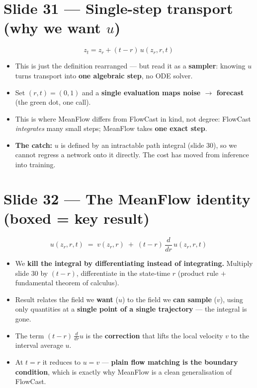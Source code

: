 \documentclass[11pt]{article}
\begin{document}
\section*{Slide 31 --- Single-step transport (why we want $u$)}
\begin{equation*}
  z_t = z_r + (t - r)\, u(z_r, r, t)
\end{equation*}
\begin{itemize}
  \item This is just the definition rearranged --- but read it as a
        \textbf{sampler}: knowing $u$ turns transport into \textbf{one
        algebraic step}, no ODE solver.
  \item Set $(r, t) = (0, 1)$ and a \textbf{single evaluation maps
        noise $\rightarrow$ forecast} (the green dot, one call).
  \item This is where MeanFlow differs from FlowCast in kind, not degree:
        FlowCast \emph{integrates} many small steps; MeanFlow takes
        \textbf{one exact step}.
  \item \textbf{The catch:} $u$ is defined by an intractable path integral
        (slide 30), so we cannot regress a network onto it directly. The cost
        has moved from inference into training.
\end{itemize}

\section*{Slide 32 --- The MeanFlow identity \textnormal{(boxed = key result)}}
\begin{equation*}
  u(z_r, r, t) \;=\; v(z_r, r) \;+\; (t - r)\, \frac{d}{dr}\, u(z_r, r, t)
\end{equation*}
\begin{itemize}
  \item We \textbf{kill the integral by differentiating instead of
        integrating.} Multiply slide 30 by $(t - r)$, differentiate in the
        state-time $r$ (product rule $+$ fundamental theorem of calculus).
  \item Result relates the field we \textbf{want} ($u$) to the field we
        \textbf{can sample} ($v$), using only quantities at a \textbf{single
        point of a single trajectory} --- the integral is gone.
  \item The term $(t - r)\, \frac{d}{dr} u$ is the \textbf{correction} that
        lifts the local velocity $v$ to the interval average $u$.
  \item At $t = r$ it reduces to $u = v$ --- \textbf{plain flow matching is
        the boundary condition}, which is exactly why MeanFlow is a clean
        generalisation of FlowCast.
\end{itemize}
\end{document}
